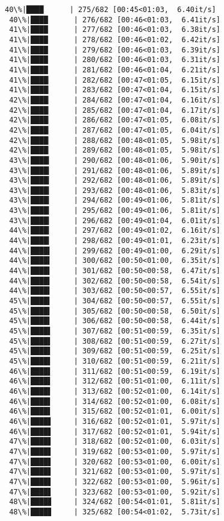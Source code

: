 \documentclass[11pt]{article}
\begin{document}
\begin{Verbatim}[commandchars=\\\{\}]
 40\%|████      | 275/682 [00:45<01:03,  6.40it/s]
 40\%|████      | 276/682 [00:46<01:03,  6.41it/s]
 41\%|████      | 277/682 [00:46<01:03,  6.38it/s]
 41\%|████      | 278/682 [00:46<01:02,  6.42it/s]
 41\%|████      | 279/682 [00:46<01:03,  6.39it/s]
 41\%|████      | 280/682 [00:46<01:03,  6.31it/s]
 41\%|████      | 281/682 [00:46<01:04,  6.21it/s]
 41\%|████▏     | 282/682 [00:47<01:05,  6.15it/s]
 41\%|████▏     | 283/682 [00:47<01:04,  6.15it/s]
 42\%|████▏     | 284/682 [00:47<01:04,  6.16it/s]
 42\%|████▏     | 285/682 [00:47<01:04,  6.17it/s]
 42\%|████▏     | 286/682 [00:47<01:05,  6.08it/s]
 42\%|████▏     | 287/682 [00:47<01:05,  6.04it/s]
 42\%|████▏     | 288/682 [00:48<01:05,  5.98it/s]
 42\%|████▏     | 289/682 [00:48<01:05,  5.98it/s]
 43\%|████▎     | 290/682 [00:48<01:06,  5.90it/s]
 43\%|████▎     | 291/682 [00:48<01:06,  5.89it/s]
 43\%|████▎     | 292/682 [00:48<01:06,  5.89it/s]
 43\%|████▎     | 293/682 [00:48<01:06,  5.83it/s]
 43\%|████▎     | 294/682 [00:49<01:06,  5.81it/s]
 43\%|████▎     | 295/682 [00:49<01:06,  5.81it/s]
 43\%|████▎     | 296/682 [00:49<01:04,  6.01it/s]
 44\%|████▎     | 297/682 [00:49<01:02,  6.16it/s]
 44\%|████▎     | 298/682 [00:49<01:01,  6.23it/s]
 44\%|████▍     | 299/682 [00:49<01:00,  6.29it/s]
 44\%|████▍     | 300/682 [00:50<01:00,  6.35it/s]
 44\%|████▍     | 301/682 [00:50<00:58,  6.47it/s]
 44\%|████▍     | 302/682 [00:50<00:58,  6.54it/s]
 44\%|████▍     | 303/682 [00:50<00:57,  6.55it/s]
 45\%|████▍     | 304/682 [00:50<00:57,  6.55it/s]
 45\%|████▍     | 305/682 [00:50<00:58,  6.50it/s]
 45\%|████▍     | 306/682 [00:50<00:58,  6.44it/s]
 45\%|████▌     | 307/682 [00:51<00:59,  6.35it/s]
 45\%|████▌     | 308/682 [00:51<00:59,  6.27it/s]
 45\%|████▌     | 309/682 [00:51<00:59,  6.25it/s]
 45\%|████▌     | 310/682 [00:51<00:59,  6.21it/s]
 46\%|████▌     | 311/682 [00:51<00:59,  6.19it/s]
 46\%|████▌     | 312/682 [00:51<01:00,  6.11it/s]
 46\%|████▌     | 313/682 [00:52<01:00,  6.14it/s]
 46\%|████▌     | 314/682 [00:52<01:00,  6.08it/s]
 46\%|████▌     | 315/682 [00:52<01:01,  6.00it/s]
 46\%|████▋     | 316/682 [00:52<01:01,  5.97it/s]
 46\%|████▋     | 317/682 [00:52<01:01,  5.94it/s]
 47\%|████▋     | 318/682 [00:52<01:00,  6.03it/s]
 47\%|████▋     | 319/682 [00:53<01:00,  5.97it/s]
 47\%|████▋     | 320/682 [00:53<01:00,  6.00it/s]
 47\%|████▋     | 321/682 [00:53<01:00,  5.97it/s]
 47\%|████▋     | 322/682 [00:53<01:00,  5.96it/s]
 47\%|████▋     | 323/682 [00:53<01:00,  5.92it/s]
 48\%|████▊     | 324/682 [00:54<01:01,  5.81it/s]
 48\%|████▊     | 325/682 [00:54<01:02,  5.73it/s]

\end{Verbatim}
\end{document}
